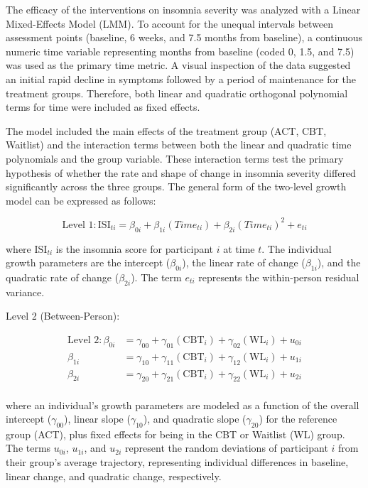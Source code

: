 \documentclass[
  english,
  man]{apa6}
\begin{document}
The efficacy of the interventions on insomnia severity was analyzed with a Linear Mixed-Effects Model (LMM). To account for the unequal intervals between assessment points (baseline, 6 weeks, and 7.5 months from baseline), a continuous numeric time variable representing months from baseline (coded 0, 1.5, and 7.5) was used as the primary time metric. A visual inspection of the data suggested an initial rapid decline in symptoms followed by a period of maintenance for the treatment groups. Therefore, both linear and quadratic orthogonal polynomial terms for time were included as fixed effects.

The model included the main effects of the treatment group (ACT, CBT, Waitlist) and the interaction terms between both the linear and quadratic time polynomials and the group variable. These interaction terms test the primary hypothesis of whether the rate and shape of change in insomnia severity differed significantly across the three groups. The general form of the two-level growth model can be expressed as follows:

\begin{equation}
\label{eq:lvl1}
\text{Level 1}: \text{ISI}_{ti} = \beta_{0i} + \beta_{1i} (Time_{ti}) + \beta_{2i} (Time_{ti})^2 + e_{ti}
\end{equation}

where \(\text{ISI}_{ti}\) is the insomnia score for participant \(i\) at time \(t\). The individual growth parameters are the intercept (\(\beta_{0i}\)), the linear rate of change (\(\beta_{1i}\)), and the quadratic rate of change (\(\beta_{2i}\)). The term \(e_{ti}\) represents the within-person residual variance.

Level 2 (Between-Person):

\[
\begin{aligned}
  \text{Level 2}: \beta_{0i} &= \gamma_{00} + \gamma_{01}(\text{CBT}_i) + \gamma_{02}(\text{WL}_i) + u_{0i}\\
  \beta_{1i} &= \gamma_{10} + \gamma_{11}(\text{CBT}_i) + \gamma_{12}(\text{WL}_i) + u_{1i}\\
  \beta_{2i} &= \gamma_{20} + \gamma_{21}(\text{CBT}_i) + \gamma_{22}(\text{WL}_i) + u_{2i}\\
\end{aligned}
\]

where an individual's growth parameters are modeled as a function of the overall intercept (\(\gamma_{00}\)), linear slope (\(\gamma_{10}\)), and quadratic slope (\(\gamma_{20}\)) for the reference group (ACT), plus fixed effects for being in the CBT or Waitlist (WL) group. The terms \(u_{0i}\), \(u_{1i}\), and \(u_{2i}\) represent the random deviations of participant \(i\) from their group's average trajectory, representing individual differences in baseline, linear change, and quadratic change, respectively.
\end{document}
